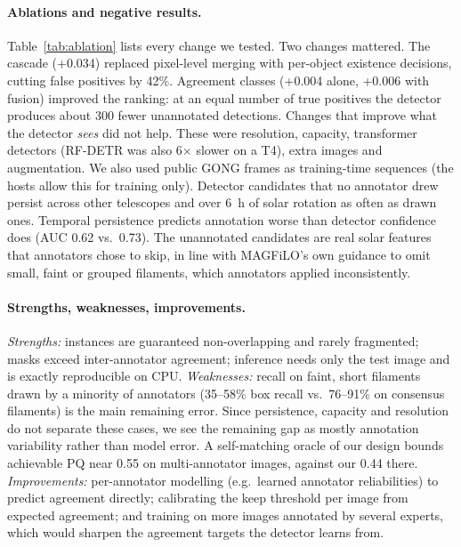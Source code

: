 \documentclass[sigconf]{acmart}
\begin{document}
\paragraph{Ablations and negative results.} Table~\ref{tab:ablation} lists every change we tested. Two changes mattered. The cascade (+0.034) replaced pixel-level merging with per-object existence decisions, cutting false positives by 42\%. Agreement classes (+0.004 alone, +0.006 with fusion) improved the ranking: at an equal number of true positives the detector produces about 300 fewer unannotated detections. Changes that improve what the detector \emph{sees} did not help. These were resolution, capacity, transformer detectors (RF-DETR was also 6$\times$ slower on a T4), extra images and augmentation. We also used public GONG frames as training-time sequences (the hosts allow this for training only). Detector candidates that no annotator drew persist across other telescopes and over 6~h of solar rotation as often as drawn ones. Temporal persistence predicts annotation worse than detector confidence does (AUC 0.62 vs.\ 0.73). The unannotated candidates are real solar features that annotators chose to skip, in line with MAGFiLO's own guidance to omit small, faint or grouped filaments, which annotators applied inconsistently.

\paragraph{Strengths, weaknesses, improvements.} \emph{Strengths:} instances are guaranteed non-overlapping and rarely fragmented; masks exceed inter-annotator agreement; inference needs only the test image and is exactly reproducible on CPU. \emph{Weaknesses:} recall on faint, short filaments drawn by a minority of annotators (35--58\% box recall vs.\ 76--91\% on consensus filaments) is the main remaining error. Since persistence, capacity and resolution do not separate these cases, we see the remaining gap as mostly annotation variability rather than model error. A self-matching oracle of our design bounds achievable PQ near 0.55 on multi-annotator images, against our 0.44 there. \emph{Improvements:} per-annotator modelling (e.g.\ learned annotator reliabilities) to predict agreement directly; calibrating the keep threshold per image from expected agreement; and training on more images annotated by several experts, which would sharpen the agreement targets the detector learns from.

\end{document}
